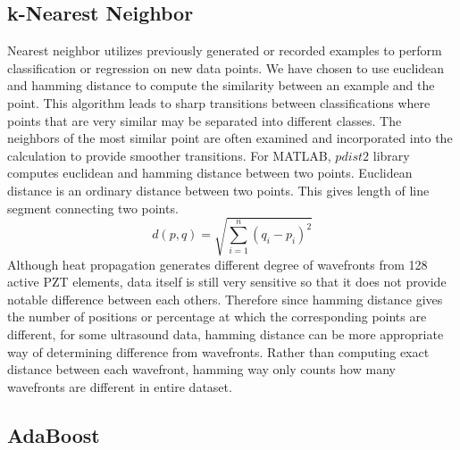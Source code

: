 \documentclass[11pt,letterpaper]{article}
\begin{document}
\subsection{k-Nearest Neighbor}
\label{sect:pdf}

Nearest neighbor utilizes previously generated or recorded examples to perform classification or regression on new data points. We have chosen to use euclidean and hamming distance to compute the similarity between an example and the point. This algorithm leads to sharp transitions between classifications where points that are very similar may be separated into different classes. The neighbors of the most similar point are often examined and incorporated into the calculation to provide smoother transitions. For MATLAB, $\textit{pdist2}$ library computes euclidean and hamming distance between two points. Euclidean distance is an ordinary distance between two points. This gives length of line segment connecting two points. 
$$ d(p,q) = \sqrt{\sum_{i=1}^{n} (q_i - p_i)^2} $$ 
Although heat propagation generates different degree of wavefronts from 128 active PZT elements, data itself is still very sensitive so that it does not provide notable difference between each others. Therefore since hamming distance gives the number of positions or percentage at which the corresponding points are different, for some ultrasound data, hamming distance can be more appropriate way of determining difference from wavefronts. Rather than computing exact distance between each wavefront, hamming way only counts how many wavefronts are different in entire dataset.

\subsection{AdaBoost}
\label{sect:pdf}
\end{document}
